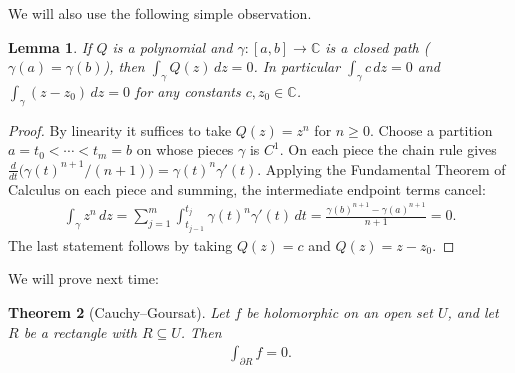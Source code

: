 \documentclass[11pt]{article}
\theoremstyle{plain}
\newtheorem{theorem}{Theorem}[section]
\newtheorem{lemma}[theorem]{Lemma}
\theoremstyle{definition}
\theoremstyle{remark}
\numberwithin{equation}{section}
\newcommand{\be}{\begin{eqnarray}}
\newcommand{\ee}{\end{eqnarray}}
\newcommand{\C}{\mathbb{C}}
\begin{document}
We will also use the following simple observation.

\begin{lemma}
\label{lem:poly-closed}
If $Q$ is a polynomial and $\gamma\colon[a,b]\to\C$ is a closed path
($\gamma(a)=\gamma(b)$), then $\int_\gamma Q(z)\,dz=0$. In particular
$\int_\gamma c\,dz=0$ and $\int_\gamma(z-z_0)\,dz=0$ for any constants
$c,z_0\in\C$.
\end{lemma}

\begin{proof}
By linearity it suffices to take $Q(z)=z^n$ for $n\geq0$. Choose a partition
$a=t_0<\cdots<t_m=b$ on whose pieces $\gamma$ is $C^1$. On each piece the
chain rule gives
$\frac{d}{dt}\bigl(\gamma(t)^{n+1}/(n+1)\bigr)=\gamma(t)^n\gamma'(t)$.
Applying the Fundamental Theorem of Calculus on each piece and summing, the
intermediate endpoint terms cancel:
\be
 \int_\gamma z^n\,dz
 =\sum_{j=1}^m\int_{t_{j-1}}^{t_j}\gamma(t)^n\gamma'(t)\,dt
 =\frac{\gamma(b)^{n+1}-\gamma(a)^{n+1}}{n+1}=0.
\ee
The last statement follows by taking $Q(z)=c$ and $Q(z)=z-z_0$.
\end{proof}

We will prove next time:

\begin{theorem}[Cauchy--Goursat]
Let $f$ be holomorphic on an open set $U$, and let $R$ be a rectangle with
$R\subseteq U$. Then
\be
 \int_{\partial R}f=0.
\ee
\end{theorem}
\end{document}
